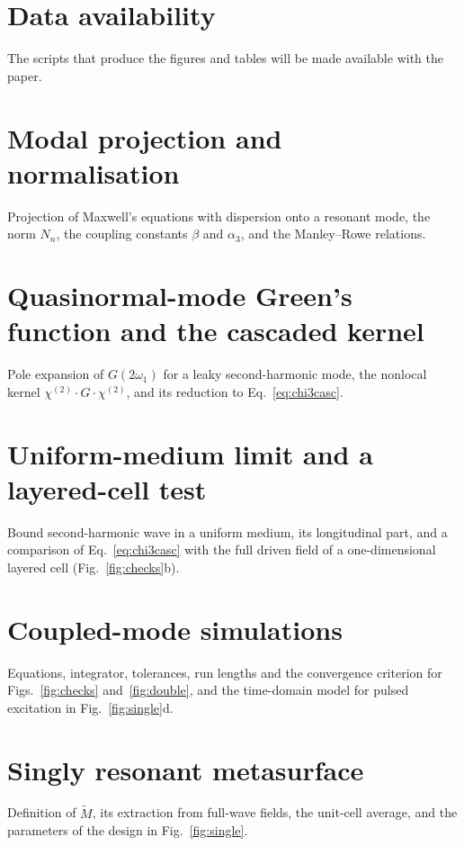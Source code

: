 \documentclass[aps,prapplied,onecolumn,superscriptaddress,longbibliography,nofootinbib]{revtex4-2}
\newcommand{\chitwo}{\chi^{(2)}}
\begin{document}

\section*{Data availability}
The scripts that produce the figures and tables will be made available
with the paper.

\appendix

\section{Modal projection and normalisation}
Projection of Maxwell's equations with dispersion onto a resonant mode,
the norm $N_n$, the coupling constants $\beta$ and $\alpha_3$, and the
Manley--Rowe relations.

\section{Quasinormal-mode Green's function and the cascaded kernel}
Pole expansion of $G(2\omega_1)$ for a leaky second-harmonic mode, the
nonlocal kernel $\chitwo\cdot G\cdot\chitwo$, and its reduction to
Eq.~\eqref{eq:chi3casc}.

\section{Uniform-medium limit and a layered-cell test}
Bound second-harmonic wave in a uniform medium, its longitudinal part, and
a comparison of Eq.~\eqref{eq:chi3casc} with the full driven field of a
one-dimensional layered cell (Fig.~\ref{fig:checks}b).

\section{Coupled-mode simulations}
Equations, integrator, tolerances, run lengths and the convergence
criterion for Figs.~\ref{fig:checks} and~\ref{fig:double}, and the
time-domain model for pulsed excitation in Fig.~\ref{fig:single}d.

\section{Singly resonant metasurface}
Definition of $\widetilde M$, its extraction from full-wave fields, the
unit-cell average, and the parameters of the design in
Fig.~\ref{fig:single}.
\end{document}
